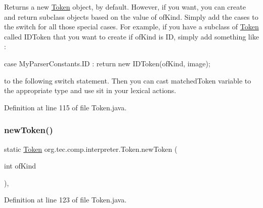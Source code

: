 Returns a new \mbox{\hyperlink{classorg_1_1tec_1_1comp_1_1interpreter_1_1_token}{Token}} object, by default. However, if you want, you can create and return subclass objects based on the value of of\+Kind. Simply add the cases to the switch for all those special cases. For example, if you have a subclass of \mbox{\hyperlink{classorg_1_1tec_1_1comp_1_1interpreter_1_1_token}{Token}} called I\+D\+Token that you want to create if of\+Kind is ID, simply add something like \+:

case My\+Parser\+Constants.\+ID \+: return new I\+D\+Token(of\+Kind, image);

to the following switch statement. Then you can cast matched\+Token variable to the appropriate type and use sit in your lexical actions. 

Definition at line 115 of file Token.\+java.

\mbox{\label{classorg_1_1tec_1_1comp_1_1interpreter_1_1_token_a7e062a84523ba6b2ee404699c3d15403}} 
\subsubsection{\texorpdfstring{new\+Token()}{newToken()}\hspace{0.1cm}{\footnotesize\ttfamily [2/2]}}
{\footnotesize\ttfamily static \mbox{\hyperlink{classorg_1_1tec_1_1comp_1_1interpreter_1_1_token}{Token}} org.\+tec.\+comp.\+interpreter.\+Token.\+new\+Token (\begin{DoxyParamCaption}\item[{int}]{of\+Kind }\end{DoxyParamCaption})\hspace{0.3cm}{\ttfamily [inline]}, {\ttfamily [static]}}



Definition at line 123 of file Token.\+java.

\mbox{\label{classorg_1_1tec_1_1comp_1_1interpreter_1_1_token_af3fcfaa2b6ae489ce87fe6674cfa6cff}} 
